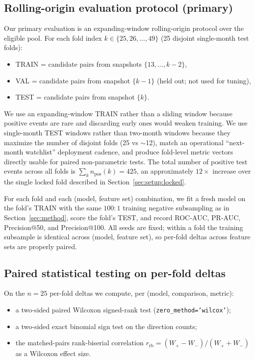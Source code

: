 \documentclass[conference]{IEEEtran}
\newcommand{\code}[1]{\texttt{#1}}
\begin{document}
\subsection{Rolling-origin evaluation protocol (primary)}
\label{sec:setup:rolling}

Our primary evaluation is an expanding-window rolling-origin protocol
over the eligible pool. For each fold index
$k \in \{25, 26, \dots, 49\}$ (25 disjoint single-month test folds):
\begin{itemize}
\item TRAIN  = candidate pairs from snapshots $\{13, \dots, k{-}2\}$,
\item VAL    = candidate pairs from snapshot $\{k{-}1\}$ (held out; not used for tuning),
\item TEST   = candidate pairs from snapshot $\{k\}$.
\end{itemize}
We use an expanding-window TRAIN rather than a sliding window because
positive events are rare and discarding early ones would weaken
training. We use single-month TEST windows rather than two-month
windows because they maximize the number of disjoint folds (25 vs
$\sim$12), match an operational ``next-month watchlist'' deployment
cadence, and produce fold-level metric vectors directly usable for
paired non-parametric tests. The total number of positive test events
across all folds is $\sum_{k} n_{\mathrm{pos}}(k) = 425$, an
approximately $12\!\times$ increase over the single locked fold
described in Section~\ref{sec:setup:locked}.

For each fold and each (model, feature set) combination, we fit a
fresh model on the fold's TRAIN with the same $100{:}1$ training
negative subsampling as in Section~\ref{sec:method}, score the fold's
TEST, and record ROC-AUC, PR-AUC, Precision@50, and Precision@100.
All seeds are fixed; within a fold the training subsample is
identical across (model, feature set), so per-fold deltas across
feature sets are properly paired.

\subsection{Paired statistical testing on per-fold deltas}
\label{sec:setup:stats}

On the $n = 25$ per-fold deltas we compute, per (model, comparison,
metric):
\begin{itemize}
\item a two-sided paired Wilcoxon signed-rank test
(\code{zero\_method='wilcox'});
\item a two-sided exact binomial sign test on the direction counts;
\item the matched-pairs rank-biserial correlation
$r_{\mathrm{rb}} = (W_+ - W_-)/(W_+ + W_-)$ as a Wilcoxon effect
size.
\end{itemize}
\end{document}
